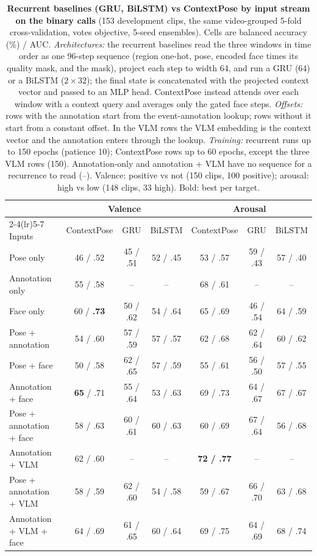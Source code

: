 \documentclass[11pt]{article}
\newcommand{\best}[1]{\textbf{#1}}
\begin{document}
\begin{table}[!htbp]
\centering
\caption{\textbf{Recurrent baselines (GRU, BiLSTM) vs ContextPose by input stream on the binary calls} (153 development clips, the same video-grouped 5-fold cross-validation, votes objective, 5-seed ensembles). Cells are balanced accuracy (\%) / AUC.
\emph{Architectures:} the recurrent baselines read the three windows in time order as one 96-step sequence (region one-hot, pose, encoded face times its quality mask, and the mask), project each step to width 64, and run a GRU (64) or a BiLSTM ($2 \times 32$); the final state is concatenated with the projected context vector and passed to an MLP head. ContextPose instead attends over each window with a context query and averages only the gated face steps.
\emph{Offsets:} rows with the annotation start from the event-annotation lookup; rows without it start from a constant offset. In the VLM rows the VLM embedding is the context vector and the annotation enters through the lookup.
\emph{Training:} recurrent runs up to 150 epochs (patience 10); ContextPose rows up to 60 epochs, except the three VLM rows (150). Annotation-only and annotation + VLM have no sequence for a recurrence to read (--). Valence: positive vs not (150 clips, 100 positive); arousal: high vs low (148 clips, 33 high). Bold: best per target.}
\label{tab:rnn}
\small
\begin{tabular}{lcccccc}
\toprule
 & \multicolumn{3}{c}{Valence} & \multicolumn{3}{c}{Arousal} \\
\cmidrule(lr){2-4}\cmidrule(lr){5-7}
Inputs & ContextPose & GRU & BiLSTM & ContextPose & GRU & BiLSTM \\
\midrule
Pose only & 46 / .52 & 45 / .51 & 52 / .45 & 53 / .57 & 59 / .43 & 57 / .40 \\
Annotation only & 55 / .58 & -- & -- & 68 / .61 & -- & -- \\
Face only & 60 / \best{.73} & 50 / .62 & 54 / .64 & 65 / .69 & 46 / .54 & 64 / .59 \\
\midrule
Pose + annotation & 54 / .60 & 57 / .59 & 57 / .57 & 62 / .68 & 62 / .64 & 60 / .62 \\
Pose + face & 50 / .58 & 62 / .65 & 57 / .59 & 55 / .61 & 56 / .50 & 57 / .55 \\
Annotation + face & \best{65} / .71 & 55 / .64 & 53 / .63 & 69 / .73 & 64 / .67 & 67 / .67 \\
\midrule
Pose + annotation + face & 58 / .63 & 60 / .61 & 60 / .63 & 60 / .69 & 67 / .64 & 56 / .68 \\
\midrule
Annotation + VLM & 62 / .60 & -- & -- & \best{72 / .77} & -- & -- \\
Pose + annotation + VLM & 58 / .59 & 62 / .60 & 54 / .58 & 59 / .67 & 66 / .70 & 63 / .68 \\
Annotation + VLM + face & 64 / .69 & 61 / .65 & 60 / .64 & 69 / .75 & 64 / .69 & 68 / .74 \\
\bottomrule
\end{tabular}
\end{table}
\end{document}
